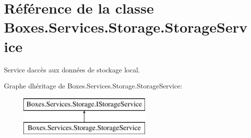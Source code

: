 \hypertarget{class_boxes_1_1_services_1_1_storage_1_1_storage_service}{}\section{Référence de la classe Boxes.\+Services.\+Storage.\+Storage\+Service}
\label{class_boxes_1_1_services_1_1_storage_1_1_storage_service}


Service d\textquotesingle{}accès aux données de stockage local.  


Graphe d\textquotesingle{}héritage de Boxes.\+Services.\+Storage.\+Storage\+Service\+:\begin{figure}[H]
\begin{center}
\leavevmode
\includegraphics[height=2.000000cm]{class_boxes_1_1_services_1_1_storage_1_1_storage_service}
\end{center}
\end{figure}
